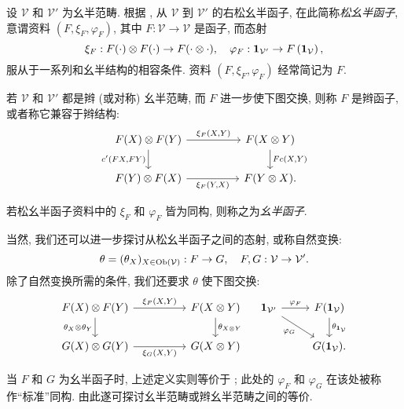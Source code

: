 \begin{definition}\label{def:lax-monoidal}
	设 $\mathcal{V}$ 和 $\mathcal{V}'$ 为幺半范畴. 根据 \cite[注记 3.1.8]{Li1}, 从 $\mathcal{V}$ 到 $\mathcal{V}'$ 的右松幺半函子, 在此简称\emph{松幺半函子}, 意谓资料 $(F, \xi_F, \varphi_F)$, 其中 $F: \mathcal{V} \to \mathcal{V}$ 是函子, 而态射
	\[ \xi_F: F(\cdot) \otimes F(\cdot) \to F(\cdot \otimes \cdot), \quad \varphi_F: \bm{1}_{\mathcal{V}'} \to F\left( \bm{1}_{\mathcal{V}} \right), \]
	服从于一系列和幺半结构的相容条件. 资料 $(F, \xi_F, \varphi_F)$ 经常简记为 $F$.
	
	若 $\mathcal{V}$ 和 $\mathcal{V}'$ 都是辫 (或对称) 幺半范畴, 而 $F$ 进一步使下图交换, 则称 $F$ 是辫函子, 或者称它兼容于辫结构:
	\[\begin{tikzcd}[column sep=huge]
		F(X) \otimes F(Y) \arrow[r, "{\xi_F(X, Y)}"] \arrow[d, "{c'(FX, FY)}"'] & F(X \otimes Y) \arrow[d, "{Fc(X, Y)}"] \\
		F(Y) \otimes F(X) \arrow[r, "{\xi_F(Y, X)}"'] & F(Y \otimes X) .
	\end{tikzcd}\]

	若松幺半函子资料中的 $\xi_F$ 和 $\varphi_F$ 皆为同构, 则称之为\emph{幺半函子}.
\end{definition}

当然, 我们还可以进一步探讨从松幺半函子之间的态射, 或称自然变换:
\[ \theta = (\theta_X)_{X \in \operatorname{Ob}(\mathcal{V})}: F \to G, \quad F, G: \mathcal{V} \to \mathcal{V}' . \]
除了自然变换所需的条件, 我们还要求 $\theta$ 使下图交换:
\[\begin{tikzcd}[column sep=huge]
	F(X) \otimes F(Y) \arrow[r, "{\xi_F(X, Y)}"] \arrow[d, "{\theta_X \otimes \theta_Y}"'] & F(X \otimes Y) \arrow[d, "{\theta_{X \otimes Y}}"] \\
	G(X) \otimes G(Y) \arrow[r, "{\xi_G(X, Y)}"'] & G(X \otimes Y)
\end{tikzcd} \quad \begin{tikzcd}
	\munit_{\mathcal{V}'} \arrow[r, "{\varphi_F}"] \arrow[rd, "{\varphi_G}"'] & F(\munit_{\mathcal{V}}) \arrow[d, "{\theta_{\munit_{\mathcal{V}}}}"] \\
	& G(\munit_{\mathcal{V}}) .
\end{tikzcd}\]

当 $F$ 和 $G$ 为幺半函子时, 上述定义实则等价于 \cite[定义 3.1.10]{Li1}; 此处的 $\varphi_F$ 和 $\varphi_G$ 在该处被称作``标准''同构. 由此遂可探讨幺半范畴或辫幺半范畴之间的等价.

